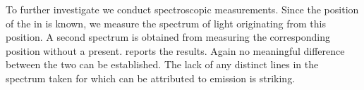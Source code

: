 		To further investigate we conduct spectroscopic measurements. Since the position of the \nd in \BmFour is known, we measure the spectrum of light originating from this position. A second spectrum is obtained from \BmTwo measuring the corresponding position without a \nd present.  reports the results. Again no meaningful difference between the two \VCSELs can be established. The lack of any distinct lines in the spectrum taken for \BmFour{} which can be attributed to \siv emission is striking.

			\begin{figure}[!htb]
				\begin{subfigure}[t]{ 0.49\linewidth}
					\centering
					\caption{}
					\label{subfig::spectrum_vcsel_excitation_with_diamond}
				\end{subfigure}
				\hfill
				\begin{subfigure}[t]{ 0.49\linewidth}
					\centering

\end{subfigure}
\end{figure}
